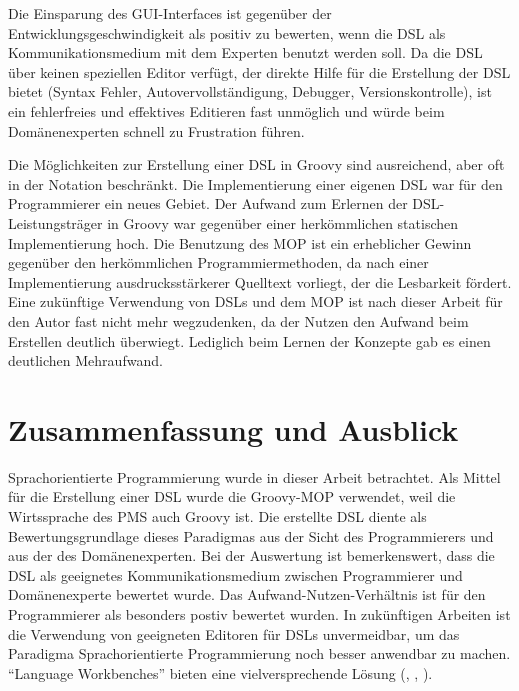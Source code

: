 \documentclass[11pt,english,ngerman, headsepline]{scrreprt}
\begin{document}
Die Einsparung des GUI-Interfaces ist gegenüber der Entwicklungsgeschwindigkeit
als positiv zu bewerten, wenn die DSL als Kommunikationsmedium mit dem Experten
benutzt werden soll. 
Da die DSL über keinen speziellen Editor verfügt, der direkte Hilfe für die
Erstellung der DSL bietet (Syntax Fehler, Autovervollständigung, Debugger,
Versionskontrolle), ist ein fehlerfreies und effektives Editieren fast unmöglich
und würde beim Domänenexperten schnell zu Frustration führen. 

Die Möglichkeiten zur Erstellung einer DSL in Groovy sind ausreichend, aber oft
in der Notation beschränkt. 
Die Implementierung einer eigenen DSL war für den Programmierer ein neues
Gebiet. Der Aufwand zum Erlernen der DSL-Leistungsträger in Groovy war gegenüber
einer herkömmlichen statischen Implementierung hoch. Die Benutzung des MOP ist ein
erheblicher Gewinn gegenüber den herkömmlichen Programmiermethoden, da nach
einer Implementierung ausdrucksstärkerer Quelltext vorliegt, der die Lesbarkeit
fördert.
Eine zukünftige Verwendung von DSLs und dem MOP ist nach dieser Arbeit für den
Autor fast nicht mehr wegzudenken, da der Nutzen den Aufwand beim 
Erstellen deutlich überwiegt. Lediglich beim Lernen der Konzepte gab es
einen deutlichen Mehraufwand. 
 
\section{Zusammenfassung und Ausblick}

Sprachorientierte Programmierung wurde in dieser Arbeit betrachtet. Als Mittel
für die Erstellung einer DSL wurde die Groovy-MOP verwendet, weil die
Wirtssprache des PMS auch Groovy ist. Die erstellte DSL diente als
Bewertungsgrundlage dieses Paradigmas aus der Sicht des Programmierers und aus
der des Domänenexperten. Bei der Auswertung ist bemerkenswert, dass die DSL als
geeignetes Kommunikationsmedium zwischen Programmierer und Domänenexperte
bewertet wurde. Das Aufwand-Nutzen-Verhältnis ist für den Programmierer als
besonders postiv bewertet wurden. In zukünftigen Arbeiten ist die Verwendung von
geeigneten Editoren für DSLs unvermeidbar, um das Paradigma Sprachorientierte
Programmierung noch besser anwendbar zu machen.  ``Language Workbenches'' bieten
eine vielversprechende Lösung (\cite{10.1109/MS.2011.139},
\cite{fowler2005language}
 \cite{dmitriev2004}, \cite{fowler2011domain}).
    

\clearpage{}
\appendix
\renewcommand{\theequation}{A-\arabic{equation}}

\setcounter{equation}{0}  %




\end{document}
